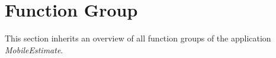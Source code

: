 \chapter{Function Group}
\label{app:funcgroup}

This section inherits an overview of all function groups of the application \textit{MobileEstimate}.
